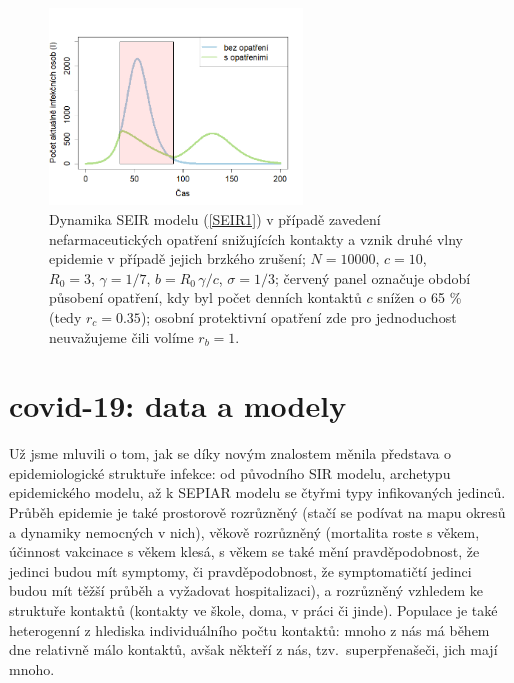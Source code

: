 \begin{figure}[h]
	\begin{center}
			\includegraphics[width=0.6\textwidth]{pic/two_waves.png}
	\end{center}
	\caption{Dynamika SEIR modelu (\ref{SEIR1}) v případě zavedení nefarmaceutických opatření snižujících kontakty a vznik druhé vlny epidemie v případě jejich brzkého zrušení; $N=10000$, $c=10$, $R_0=3$, $\gamma=1/7$, $b=R_0\,\gamma/c$, $\sigma=1/3$; červený panel označuje období působení opatření, kdy byl počet denních kontaktů $c$ snížen o 65 \% (tedy $r_c=0.35$); osobní protektivní opatření zde pro jednoduchost neuvažujeme čili volíme $r_b=1$. %
	}
	\label{SEIR-vlna}
\end{figure}

\section*{covid-19: data a modely}

Už jsme mluvili o tom, jak se díky novým znalostem měnila představa o epidemiologické struktuře infekce: od původního SIR modelu, archetypu epidemického modelu, až k SEPIAR modelu se čtyřmi typy infikovaných jedinců. Průběh epidemie je také prostorově rozrůzněný (stačí se podívat na mapu okresů a dynamiky nemocných v nich), věkově rozrůzněný (mortalita roste s věkem, účinnost vakcinace s věkem klesá, s věkem se také mění pravděpodobnost, že jedinci budou mít symptomy, či pravděpodobnost, že symptomatičtí jedinci budou mít těžší průběh a vyžadovat hospitalizaci), a rozrůzněný vzhledem ke struktuře kontaktů (kontakty ve škole, doma, v práci či jinde). Populace je také heterogenní z hlediska individuálního počtu kontaktů: mnoho z nás má během dne relativně málo kontaktů, avšak někteří z nás, tzv.\ superpřenašeči, jich mají mnoho. 

